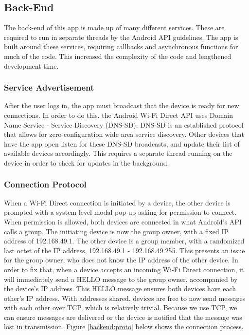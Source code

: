 \documentclass[10pt]{article}
\begin{document}
\subsection{Back-End}
The back-end of this app is made up of many different services. These are required to run in separate threads by the Android API guidelines. The app is built around these services, requiring callbacks and asynchronous functions for much of the code. This increased the complexity of the code and lengthened development time.
\subsubsection{Service Advertisement}

After the user logs in, the app must broadcast that the device is ready for new connections. In order to do this, the Android Wi-Fi Direct API uses Domain Name Service - Service Discovery (DNS-SD). DNS-SD is an established protocol that allows for zero-configuration wide area service discovery. Other devices that have the app open listen for these DNS-SD broadcasts, and update their list of available devices accordingly. This requires a separate thread running on the device in order to check for updates in the background.

\subsubsection{Connection Protocol}
When a Wi-Fi Direct connection is initiated by a device, the other device is prompted with a system-level modal pop-up asking for permission to connect. When permission is allowed, both devices are connected in what Android's API calls a group. The initiating device is now the group owner, with a fixed IP address of 192.168.49.1. The other device is a group member, with a randomized last octet of the IP address, 192.168.49.1 - 192.168.49.255. This presents an issue for the group owner, who does not know the IP address of the other device. In order to fix that, when a device accepts an incoming Wi-Fi Direct connection, it will immediately send a HELLO message to the group owner, accompanied by the device's IP address. This HELLO message ensures both devices have each other's IP address. With addresses shared, devices are free to now send messages with each other over TCP, which is relatively trivial. Because we use TCP, we can ensure messages are delivered or the device is notified that the message was lost in transmission. Figure \ref{backend:proto} below shows the connection process.
\end{document}
